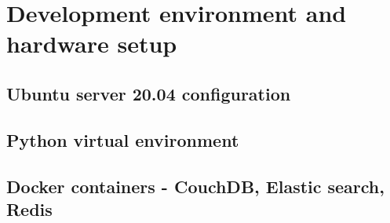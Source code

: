 \chapter{Development environment and hardware setup}

\section {Ubuntu server 20.04 configuration}

\section {Python virtual environment}

\section {Docker containers - CouchDB, Elastic search, Redis}